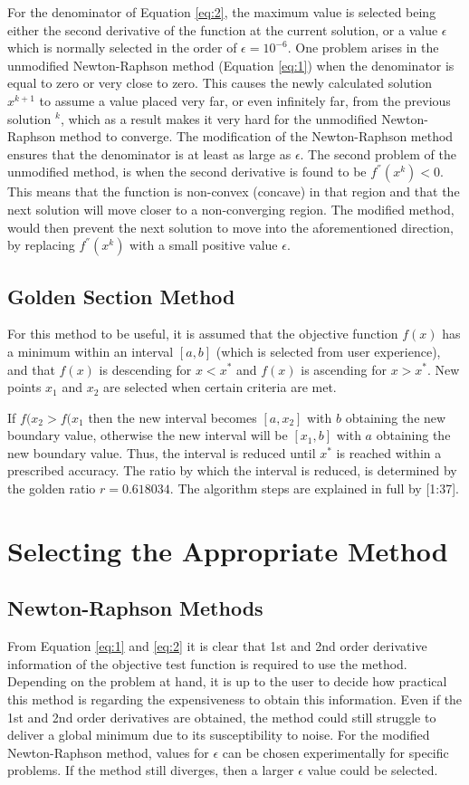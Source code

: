 \documentclass[a4paper,10pt]{article}
\begin{document}
For the denominator of Equation \ref{eq:2}, the maximum value is selected being either the second derivative of the function at the current solution, or a value $\epsilon$ which is normally selected in the order of $\epsilon = 10^{-6}$. One problem arises in the unmodified Newton-Raphson method (Equation \ref{eq:1}) when the denominator is equal to zero or very close to zero. This causes the newly calculated solution $x^{k+1}$ to assume a value placed very far, or even infinitely far, from the previous solution $^{k}$, which as a result makes it very hard for the unmodified Newton-Raphson method to converge. The modification of the Newton-Raphson method ensures that the denominator is at least as large as $\epsilon$. The second problem of the unmodified method, is when the second derivative is found to be $f^{''}(x^{k}) < 0$. This means that the function is non-convex (concave) in that region and that the next solution will move closer to a non-converging region. The modified method, would then prevent the next solution to move into the aforementioned direction, by replacing $f^{''}(x^{k})$ with a small positive value $\epsilon$.

\subsection{Golden Section Method}
For this method to be useful, it is assumed that the objective function $f(x)$ has a minimum within an interval $[a,b]$ (which is selected from user experience), and that $f(x)$ is descending for $x < x^*$ and $f(x)$ is ascending for $x > x^*$. New points $x_{1}$ and $x_{2}$ are selected when certain criteria are met.

If $f(x_{2} > f(x_{1}$ then the new interval becomes $[a,x_{2}]$ with $b$ obtaining the new boundary value, otherwise the new interval will be $[x_{1},b]$ with $a$ obtaining the new boundary value. Thus, the interval is reduced until $x^{*}$ is reached within a prescribed accuracy. The ratio by which the interval is reduced, is determined by the golden ratio $r=0.618034$. The algorithm steps are explained in full by [1:37].

\section{Selecting the Appropriate Method}
\subsection{Newton-Raphson Methods}
From Equation \ref{eq:1} and \ref{eq:2} it is clear that 1st and 2nd order derivative information of the objective test function is required to use the method. Depending on the problem at hand, it is up to the user to decide how practical this method is regarding the expensiveness to obtain this information. Even if the 1st and 2nd order derivatives are obtained, the method could still struggle to deliver a global minimum due to its susceptibility to noise. For the modified Newton-Raphson method, values for $\epsilon$ can be chosen experimentally for specific problems. If the method still diverges, then a larger $\epsilon$ value could be selected.
\end{document}
